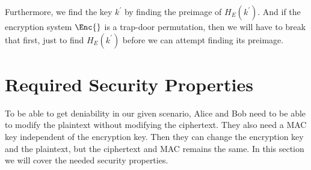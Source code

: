 Furthermore, we find the key \(k^\prime\) by finding the preimage of \(H_E( 
k^\prime )\).
And if the encryption system \(\Enc{}\) is a trap-door permutation, then we 
will have to break that first, just to find \(H_E( k^\prime )\) before we can 
attempt finding its preimage.


\section{Required Security Properties}
\label{SecurityProperties}

To be able to get deniability in our given scenario, Alice and Bob need to be 
able to modify the plaintext without modifying the ciphertext.
They also need a \ac{MAC} key independent of the encryption key.
Then they can change the encryption key and the plaintext, but the ciphertext 
and \ac{MAC} remains the same.
In this section we will cover the needed security properties.

